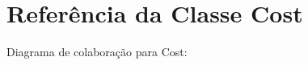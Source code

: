 \hypertarget{classCost}{}\section{Referência da Classe Cost}
\label{classCost}


Diagrama de colaboração para Cost\+:
